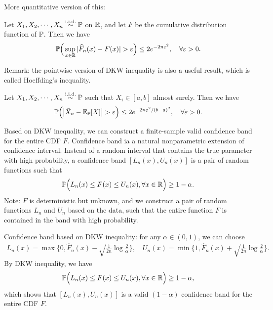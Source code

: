 \documentclass[11pt,letterpaper]{article}
\numberwithin{assumption}{lecture}
\numberwithin{theorem}{lecture}
\numberwithin{proposition}{lecture}
\numberwithin{lemma}{lecture}
\numberwithin{claim}{lecture}
\numberwithin{corollary}{lecture}
\numberwithin{definition}{lecture}
\numberwithin{conjecture}{lecture}
\numberwithin{remark}{lecture}
\numberwithin{example}{lecture}
\numberwithin{equation}{lecture}
\begin{document}
More quantitative version of this:
\begin{theorem}
  Let $X_1, X_2, \cdots, X_n \overset{\mathrm{i.i.d.}}{\sim} {\mathbb{P}}$ on $\mathbb{R}$, and let $F$ be the cumulative distribution function of ${\mathbb{P}}$. Then we have
  \begin{align*}
    {\mathbb{P}}\Big(\sup_{x \in \mathbb{R}} |\widehat{F}_n(x) - F(x)| > \varepsilon\Big) \leq 2 e^{-2 n \varepsilon^2}, \quad \forall \varepsilon > 0.
  \end{align*}
\end{theorem}
Remark: the pointwise version of DKW inequality is also a useful result, which is called Hoeffding's inequality.
\begin{theorem}
  Let $X_1, X_2, \cdots, X_n \overset{\mathrm{i.i.d.}}{\sim} {\mathbb{P}}$ such that $X_i \in  [a, b]$ almost surely. Then we have
  \begin{align*}
    {\mathbb{P}}\Big(\big|\bar{X}_n - {\mathbb{E}}_{{\mathbb{P}}}[X]\big| > \varepsilon\Big) \leq 2 e^{-2 n \varepsilon^2 / (b - a)^2}, \quad \forall \varepsilon > 0.
  \end{align*}
\end{theorem}
Based on DKW inequality, we can construct a finite-sample valid confidence band for the entire CDF $F$. Confidence band ia a natural nonparametric extension of confidence interval. Instead of a random interval that contains the true parameter with high probability, a confidence band $[L_n(x), U_n(x)]$ is a pair of random functions such that
\begin{align*}
  {\mathbb{P}} \Big(L_n(x) \leq F(x) \le U_n(x), \forall x \in \mathbb{R}\Big) \geq 1 - \alpha.
\end{align*}
Note: $F$ is deterministic but unknown, and we construct a pair of random functions $L_n$ and $U_n$ based on the data, such that the entire function $F$ is contained in the band with high probability.

Confidence band based on DKW inequality: for any $\alpha \in (0,1)$, we can choose
\begin{align*}
  L_n(x) = \max\Big\{0, \widehat{F}_n(x) - \sqrt{\frac{1}{2 n} \log \frac{2}{\alpha}}\Big\}, \quad U_n(x) = \min\Big\{1, \widehat{F}_n(x) + \sqrt{\frac{1}{2 n} \log \frac{2}{\alpha}}\Big\}.
\end{align*}
By DKW inequality, we have
\begin{align*}
  {\mathbb{P}}\Big(L_n(x) \leq F(x) \le U_n(x), \forall x \in \mathbb{R}\Big) \geq 1 - \alpha,
\end{align*}
which shows that $[L_n(x), U_n(x)]$ is a valid $(1 - \alpha)$ confidence band for the entire CDF $F$.
\end{document}
